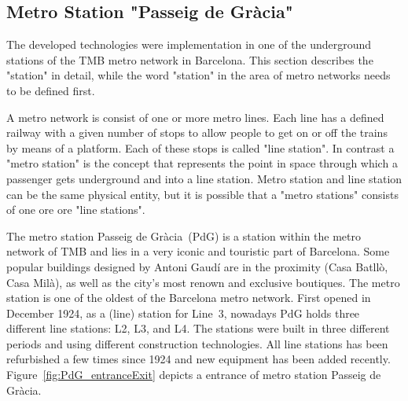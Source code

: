 \subsection{Metro Station "Passeig de Gr\`{a}cia"}
\label{subsec:station}


The developed technologies were implementation in one of the underground stations of the TMB metro network in Barcelona. This section describes the "station" in detail, while the word "station" in the area of metro networks needs to be defined first.

A metro network is consist of one or more metro lines. Each line has a defined railway with a given number of stops to allow people to get on or off the trains by means of a platform. Each of these stops is called "line station". In contrast a "metro station" is the concept that represents the point in space through which a passenger gets underground and into a line station. Metro station and line station can be the same physical entity, but it is possible that a "metro stations" consists of one ore ore "line stations".

The metro station Passeig de Gr\`{a}cia~(PdG) is a station within the metro network of TMB and lies in a very iconic and touristic part of Barcelona. Some popular buildings designed by Antoni Gaud\'{i} are in the proximity (Casa Batll\`{o}, Casa Mil\`{a}), as well as the city's most renown and exclusive boutiques.
The metro station is one of the oldest of the Barcelona metro network. First opened in December 1924, as a (line) station for Line~3, nowadays PdG holds three different line stations: L2, L3, and L4. The stations were built in three different periods and using different construction technologies. All line stations has been refurbished a few times since 1924 and new equipment has been added recently. Figure~\ref{fig:PdG_entranceExit} depicts a entrance of metro station Passeig de Gr\`{a}cia.


